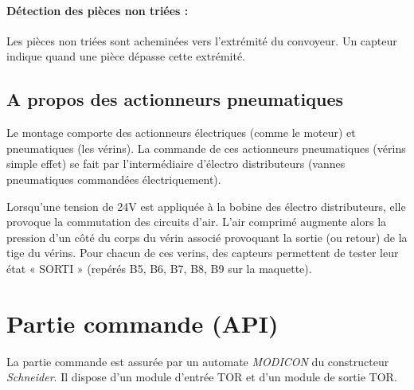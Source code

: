 \documentclass[11pt, multicol]{article}
\begin{document}
\paragraph{Détection des pièces non triées : } Les pièces non triées sont acheminées vers l’extrémité du convoyeur. Un capteur indique
quand une pièce dépasse cette extrémité.

\subsection{A propos des actionneurs pneumatiques}
Le montage comporte des actionneurs électriques (comme le moteur) et pneumatiques (les vérins).
La commande de ces actionneurs pneumatiques (vérins simple effet) se fait par l’intermédiaire
d’électro distributeurs (vannes pneumatiques commandées électriquement).

Lorsqu'une tension de 24V est appliquée à la bobine des électro distributeurs, elle provoque la commutation des circuits d’air. L'air comprimé augmente alors la pression d'un côté du corps du vérin associé provoquant la sortie (ou retour) de la tige du vérins.
Pour chacun de ces verins, des capteurs permettent de tester leur état « SORTI » (repérés B5, B6, B7, B8, B9 sur la maquette).


\section{Partie commande (API)}
La partie commande est assurée par un automate \textit{MODICON} du constructeur \textit{Schneider}. Il dispose d'un module d'entrée TOR et d'un module de sortie TOR.

\end{document}
